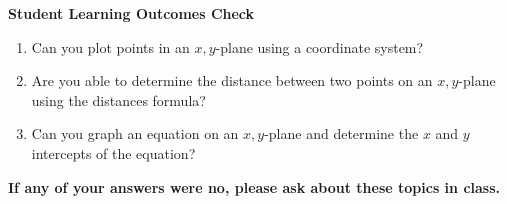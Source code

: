 \documentclass[11pt]{article}
\begin{document}
\noindent \textbf{Student Learning Outcomes Check}

\begin{enumerate}
\item Can you plot points in an $x,y$-plane using a coordinate system?\\
\item Are you able to determine the distance between two points on an $x,y$-plane using the distances formula?\\
\item Can you graph an equation on an $x,y$-plane and determine the $x$ and $y$ intercepts of the equation?
\end{enumerate}

\noindent \textbf{If any of your answers were no, please ask about these topics in class.}
\end{document}
